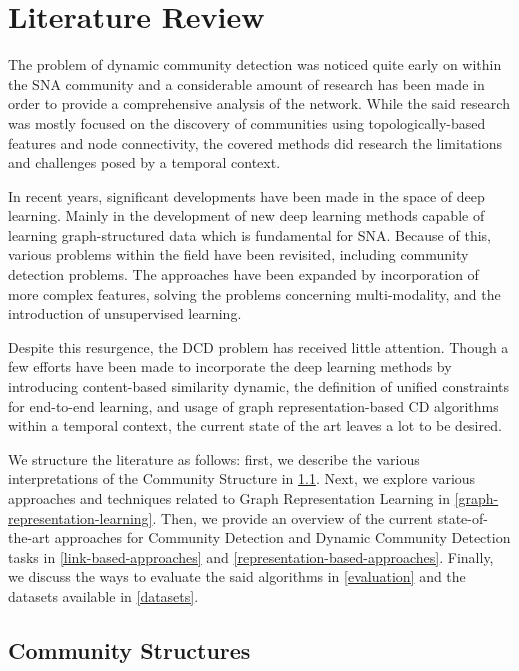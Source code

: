 \documentclass[
acmsmall,
nonacm,
screen,
acmthm]{../../scripts/pandoc/templates/acmart}
\begin{document}
\hypertarget{literature-review}{%
\section{Literature Review}\label{literature-review}}

The problem of dynamic community detection was noticed quite early on
within the SNA community and a considerable amount of research has been
made in order to provide a comprehensive analysis of the network. While
the said research was mostly focused on the discovery of communities
using topologically-based features and node connectivity, the covered
methods did research the limitations and challenges posed by a temporal
context.

In recent years, significant developments have been made in the space of
deep learning. Mainly in the development of new deep learning methods
capable of learning graph-structured data
\citep{bronsteinGeometricDeepLearning2017, hamiltonRepresentationLearningGraphs2018, kipfSemiSupervisedClassificationGraph2017}
which is fundamental for SNA. Because of this, various problems within
the field have been revisited, including community detection problems.
The approaches have been expanded by incorporation of more complex
features, solving the problems concerning multi-modality, and the
introduction of unsupervised learning.

Despite this resurgence, the DCD problem has received little attention.
Though a few efforts have been made to incorporate the deep learning
methods by introducing content-based similarity dynamic, the definition
of unified constraints for end-to-end learning, and usage of graph
representation-based CD algorithms within a temporal context, the
current state of the art leaves a lot to be desired.

We structure the literature as follows: first, we describe the various
interpretations of the Community Structure in
\cref{community-structures}. Next, we explore various approaches and
techniques related to Graph Representation Learning in
\cref{graph-representation-learning}. Then, we provide an overview of
the current state-of-the-art approaches for Community Detection and
Dynamic Community Detection tasks in \cref{link-based-approaches} and
\cref{representation-based-approaches}. Finally, we discuss the ways to
evaluate the said algorithms in \cref{evaluation} and the datasets
available in \cref{datasets}.

\hypertarget{community-structures}{%
\subsection{Community Structures}\label{community-structures}}
\end{document}
